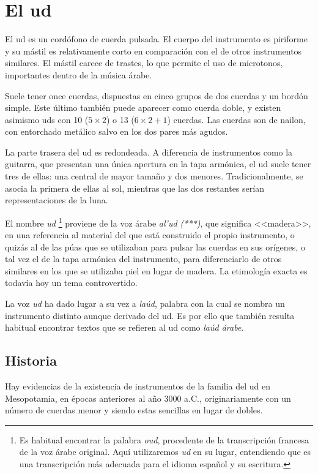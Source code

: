 \chapter{El ud}

El ud es un cordófono de cuerda pulsada. El cuerpo del instrumento es piriforme y su mástil es relativamente corto en comparación con el de otros instrumentos similares. El mástil carece de trastes, lo que permite el uso de microtonos, importantes dentro de la música árabe.

Suele tener once cuerdas, dispuestas en cinco grupos de dos cuerdas y un bordón simple. Este último también puede aparecer como cuerda doble, y existen asimismo uds con 10 ($5\times2$) o 13 ($6\times2+1$) cuerdas. Las cuerdas son de nailon, con entorchado metálico salvo en los dos pares más agudos.

La parte trasera del ud es redondeada. A diferencia de instrumentos como la guitarra, que presentan una única apertura en la tapa armónica, el ud suele tener tres de ellas: una central de mayor tamaño y dos menores. Tradicionalmente, se asocia la primera de ellas al sol, mientras que las dos restantes serían representaciones de la luna.

El nombre \emph{ud} \footnote{Es habitual encontrar la palabra \emph{oud}, procedente de la transcripción francesa de la voz árabe original. Aquí utilizaremos \emph{ud} en su lugar, entendiendo que es una transcripción más adecuada para el idioma español y su escritura.} proviene de la voz árabe \emph{al'ud (***)}, que significa <<madera>>, en una referencia al material del que está construido el propio instrumento, o quizás al de las púas que se utilizaban para pulsar las cuerdas en sus orígenes, o tal vez el de la tapa armónica del instrumento, para diferenciarlo de otros similares en los que se utilizaba piel en lugar de madera. La etimología exacta es todavía hoy un tema controvertido.

La voz \emph{ud} ha dado lugar a su vez a \emph{laúd}, palabra con la cual se nombra un instrumento distinto aunque derivado del ud. Es por ello que también resulta habitual encontrar textos que se refieren al ud como \emph{laúd árabe}.

\section{Historia}

Hay evidencias de la existencia de instrumentos de la familia del ud en Mesopotamia, en épocas anteriores al año 3000 a.C., originariamente con un número de cuerdas menor y siendo estas sencillas en lugar de dobles.

